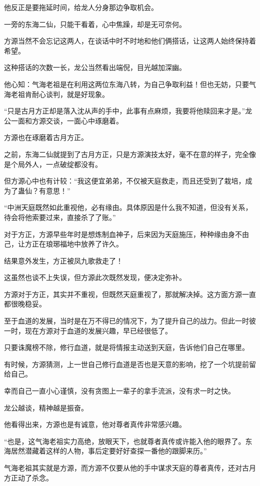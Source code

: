 \begin{this_body}
他反正是要拖延时间，给龙人分身那边争取机会。

一旁的东海二仙，只能干看着，心中焦躁，却是无可奈何。

方源当然不会忘记这两人，在谈话中时不时地和他们俩搭话，让这两人始终保持着希望。

这种搭话的次数一长，龙公当然看出端倪，目光越加深幽。

他心知：气海老祖是在利用这两位东海八转，为自己争取利益！但也无妨，只要气海老祖肯耐心谈判，就是好现象。

“只是古月方正却是落入沈从声的手中，此事有点麻烦，我要将他赎回来才是。”龙公一面和方源交谈，一面心中琢磨着。

方源也在琢磨着古月方正。

之前，东海二仙就提到了古月方正，只是方源演技太好，毫不在意的样子，完全像是个局外人，一点破绽都没有。

但方源心中也有计较：“我这便宜弟弟，不仅被天庭救走，而且还受到了栽培，成为了蛊仙？有意思！”

“中洲天庭既然如此重视他，必有缘由。具体原因是什么我不知道，但没有关系，待会将他索要过来，直接杀了了账。”

对于方正，方源早些年时是想炼制血神子，后来因为天庭施压，种种缘由身不由己，让方正在琅琊福地中放养了许久。

结果意外发生，方正被凤九歌救走了！

这虽然也谈不上失误，但方源此次既然发现，便决定弥补。

方源对于方正，其实并不重视，但既然天庭重视了，那就解决掉。这方面方源一直都很晚稳妥。

至于血道的发展，当时是在万不得已的情况下，为了提升自己的战力。但此一时彼一时，现在方源对于血道的发展兴趣，早已经很低了。

只要诛魔榜不除，修行血道，就是将情报主动送到天庭，告诉他们自己在哪里。

有时候，方源猜测，上一世自己修行血道是否也是天意的影响，挖了一个坑提前留给自己。

幸而自己一直小心谨慎，没有贪图上一辈子的拿手流派，没有求一时之快。

龙公越谈，精神越是振奋。

他看得出来，方源也是有诚意，他对尊者真传非常感兴趣。

“也是，这气海老祖实力高绝，放眼天下，也就尊者真传或许能入他的眼界了。东海居然潜藏着这样的人物，事后定要好好查探一番他的跟脚来历。”

气海老祖其实就是方源，而方源不仅要从他的手中谋求天庭的尊者真传，还对古月方正动了杀念。


\end{this_body}
